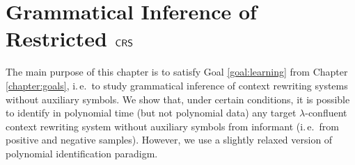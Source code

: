 \chapter[\texorpdfstring{Grammatical Inference of Restricted $\CRS$}%
                        {Grammatical Inference of Restricted CRS}]%
                        {Grammatical Inference of Restricted $\bm{\textup{\sf CRS\/}}$}\label{chapter:inference}

The main purpose of this chapter is to satisfy Goal \ref{goal:learning} from Chapter \ref{chapter:goals}, i.\,e.\ to study grammatical inference of context rewriting systems without auxiliary symbols. We show that, under certain conditions, it is possible to identify in polynomial time (but not polynomial data) any target $\lambda$-confluent context rewriting system without auxiliary symbols from informant (i.\,e.\ from positive and negative samples). However, we use a slightly relaxed version of polynomial identification paradigm.                        

